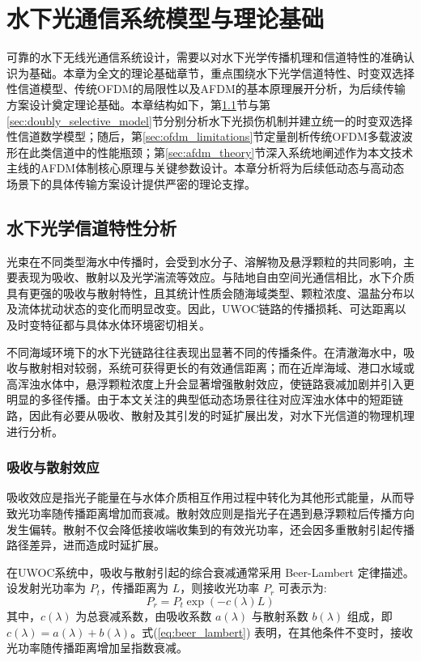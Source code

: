 \chapter{水下光通信系统模型与理论基础}
\label{chap:theory_model}

可靠的水下无线光通信系统设计，需要以对水下光学传播机理和信道特性的准确认识为基础。本章为全文的理论基础章节，重点围绕水下光学信道特性、时变双选择性信道模型、传统OFDM的局限性以及AFDM的基本原理展开分析，为后续传输方案设计奠定理论基础。本章结构如下，第\ref{sec:underwater_channel}节与第\ref{sec:doubly_selective_model}节分别分析水下光损伤机制并建立统一的时变双选择性信道数学模型；随后，第\ref{sec:ofdm_limitations}节定量剖析传统OFDM多载波波形在此类信道中的性能瓶颈；第\ref{sec:afdm_theory}节深入系统地阐述作为本文技术主线的AFDM体制核心原理与关键参数设计。本章分析将为后续低动态与高动态场景下的具体传输方案设计提供严密的理论支撑。
\section{水下光学信道特性分析}
\label{sec:underwater_channel}

光束在不同类型海水中传播时，会受到水分子、溶解物及悬浮颗粒的共同影响，主要表现为吸收、散射以及光学湍流等效应\cite{kaushalUnderwaterOpticalWireless2016a}。与陆地自由空间光通信相比，水下介质具有更强的吸收与散射特性，且其统计性质会随海域类型、颗粒浓度、温盐分布以及流体扰动状态的变化而明显改变。因此，UWOC链路的传播损耗、可达距离以及时变特征都与具体水体环境密切相关。

不同海域环境下的水下光链路往往表现出显著不同的传播条件。在清澈海水中，吸收与散射相对较弱，系统可获得更长的有效通信距离；而在近岸海域、港口水域或高浑浊水体中，悬浮颗粒浓度上升会显著增强散射效应，使链路衰减加剧并引入更明显的多径传播。由于本文关注的典型低动态场景往往对应浑浊水体中的短距链路，因此有必要从吸收、散射及其引发的时延扩展出发，对水下光信道的物理机理进行分析。

\subsection{吸收与散射效应}

吸收效应是指光子能量在与水体介质相互作用过程中转化为其他形式能量，从而导致光功率随传播距离增加而衰减。散射效应则是指光子在遇到悬浮颗粒后传播方向发生偏转。散射不仅会降低接收端收集到的有效光功率，还会因多重散射引起传播路径差异，进而造成时延扩展\cite{jaruwatanadilokUnderwaterWirelessOptical2008}。

在UWOC系统中，吸收与散射引起的综合衰减通常采用 Beer-Lambert 定律描述。设发射光功率为 $P_t$，传播距离为 $L$，则接收光功率 $P_r$ 可表示为:
\begin{equation}
    P_{r} = P_{t} \exp(-c(\lambda) L)
\label{eq:beer_lambert}
\end{equation}
其中，$c(\lambda)$ 为总衰减系数，由吸收系数 $a(\lambda)$ 与散射系数 $b(\lambda)$ 组成，即 $c(\lambda)=a(\lambda)+b(\lambda)$\cite{zengSurveyUnderwaterOptical2017}。式(\ref{eq:beer_lambert}) 表明，在其他条件不变时，接收光功率随传播距离增加呈指数衰减。

